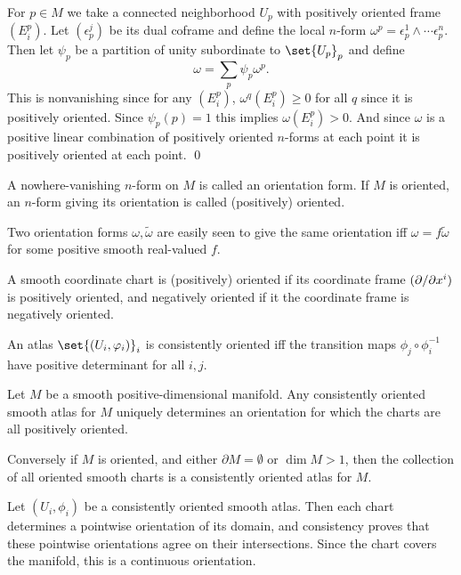     For $p\in M$ we take a connected neighborhood $U_p$ with positively oriented frame $(E_i^p)$.
    Let $(\epsilon^j_p)$ be its dual coframe and define the local $n$-form $\omega^p=\epsilon^1_p\wedge\cdots\epsilon^n_p$.
    Then let $\psi_p$ be a partition of unity subordinate to $\set{U_p}_p$ and define
    $$ \omega = \sum_p\psi_p\omega^p . $$
    This is nonvanishing since for any $(E_i^p)$, $\omega^q(E_i^p)\geq0$ for all $q$ since it is positively oriented.
    Since $\psi_p(p)=1$ this implies $\omega(E_i^p)>0$.
    And since $\omega$ is a positive linear combination of positively oriented $n$-forms at each point it is positively
    oriented at each point.
    \qed

\eproof

\bdefn

    A nowhere-vanishing $n$-form on $M$ is called an {\emphcolor orientation form}.
    If $M$ is oriented, an $n$-form giving its orientation is called {\emphcolor (positively) oriented}.

\edefn

Two orientation forms $\omega,\tilde\omega$ are easily seen to give the same orientation iff $\omega=f\tilde\omega$ for some
positive smooth real-valued $f$.

\bdefn

    A smooth coordinate chart is {\emphcolor (positively) oriented} if its coordinate frame $(\partial /\partial x^i)$ is positively
    oriented, and {\emphcolor negatively oriented} if it the coordinate frame is negatively oriented.

    An atlas $\set{(U_i,\phi_i)}_i$ is {\emphcolor consistently oriented} iff the transition maps $\phi_j\circ\phi_i^{-1}$
    have positive determinant for all $i,j$.

\edefn

\bprop

    Let $M$ be a smooth positive-dimensional manifold.
    Any consistently oriented smooth atlas for $M$ uniquely determines an orientation for which the charts are
    all positively oriented.

    Conversely if $M$ is oriented, and either $\partial M=\emptyset$ or $\dim M>1$, then the collection of all oriented smooth
    charts is a consistently oriented atlas for $M$.

\eprop

\bproof

    Let $(U_i,\phi_i)$ be a consistently oriented smooth atlas.
    Then each chart determines a pointwise orientation of its domain, and consistency proves that these pointwise orientations
    agree on their intersections.
    Since the chart covers the manifold, this is a continuous orientation.

